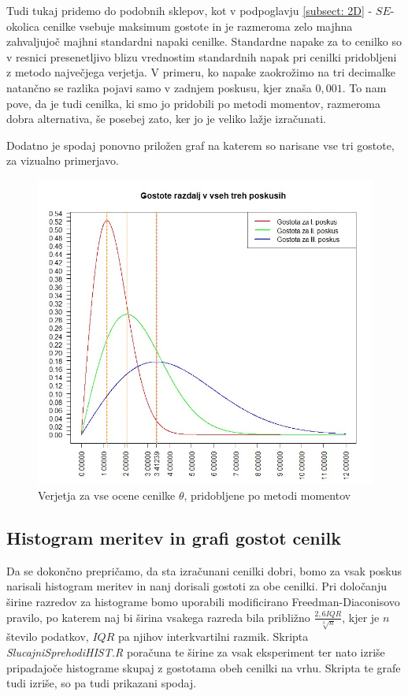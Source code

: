 \documentclass[a4paper, 10pt]{article}
\begin{document}
	Tudi tukaj pridemo do podobnih sklepov, kot v podpoglavju \ref{subsect: 2D} - $SE$-okolica cenilke vsebuje maksimum gostote in je razmeroma zelo majhna zahvaljujoč majhni standardni napaki cenilke. Standardne napake za to cenilko so v resnici presenetljivo blizu vrednostim standardnih napak pri cenilki pridobljeni z metodo največjega verjetja. V primeru, ko napake zaokrožimo na tri decimalke natančno se razlika pojavi samo v zadnjem poskusu, kjer znaša $0{,}001$. To nam pove, da je tudi cenilka, ki smo jo pridobili po metodi momentov, razmeroma dobra alternativa, še posebej zato, ker jo je veliko lažje izračunati.
	
	Dodatno je spodaj ponovno priložen graf na katerem so narisane vse tri gostote, za vizualno primerjavo.
	\begin{figure}[h!]
		\label{fig: 2Eplot4}
		\centering
		\includegraphics[scale = 0.35]{VerjetjeMM4}
		\caption{Verjetja za vse ocene cenilke $\theta$, pridobljene po metodi momentov}
	\end{figure}
	
	\subsection{Histogram meritev in grafi gostot cenilk} \label{subsect: 2F}
	Da se dokončno prepričamo, da sta izračunani cenilki dobri, bomo za vsak poskus narisali histogram meritev in nanj dorisali gostoti za obe cenilki. Pri določanju širine razredov za histograme bomo uporabili modificirano Freedman-Diaconisovo pravilo, po katerem naj bi širina vsakega razreda bila približno $\frac{2{,}6IQR}{\sqrt[3]{n}}$, kjer je $n$ število podatkov, $IQR$ pa njihov interkvartilni razmik. Skripta \textit{SlucajniSprehodiHIST.R} poračuna te širine za vsak eksperiment ter nato izriše pripadajoče histograme skupaj z gostotama obeh cenilki na vrhu. Skripta te grafe tudi izriše, so pa tudi prikazani spodaj.
	
\end{document}

